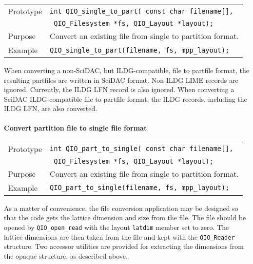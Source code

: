 \documentclass{article}
\begin{document}
\begin{flushleft}
  \begin{tabular}{|l|l|}
  \hline
  Prototype      & \verb|int QIO_single_to_part( const char filename[], | \\
                 & \verb| QIO_Filesystem *fs, QIO_Layout *layout);| \\
  Purpose        & Convert an existing file from single to partition format. \\
\hline
  Example  & \verb|QIO_single_to_part(filename, fs, mpp_layout);|\\
   \hline
 \end{tabular}
\end{flushleft}
%

When converting a non-SciDAC, but ILDG-compatible, file to partfile
format, the resulting partfiles are written in SciDAC format.
Non-ILDG LIME records are ignored.  Currently, the ILDG LFN record is
also ignored.  When converting a SciDAC ILDG-compatible file to
partfile format, the ILDG records, including the ILDG LFN, are also
converted.

\paragraph{Convert partition file to single file format}

\begin{flushleft}
  \begin{tabular}{|l|l|}
  \hline
  Prototype      & \verb|int QIO_part_to_single( const char filename[], | \\
                 & \verb| QIO_Filesystem *fs, QIO_Layout *layout);| \\
  Purpose        & Convert an existing file from single to partition format. \\
\hline
  Example  & \verb|QIO_part_to_single(filename, fs, mpp_layout);|\\
   \hline
 \end{tabular}
\end{flushleft}
%

As a matter of convenience, the file conversion application may be
designed so that the code gets the lattice dimension and size from the
file.  The file should be opened by \verb|QIO_open_read| with the
layout \verb|latdim| member set to zero.  The lattice dimensions are
then taken from the file and kept with the \verb|QIO_Reader|
structure.  Two accessor utilities are provided for extracting the
dimensions from the opaque structure, as described above.
\end{document}
